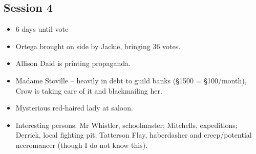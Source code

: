 \documentclass[10pt,a4paper]{article}
\begin{document}
\subsection*{Session 4}
  
  \begin{itemize}
    \item 6 days until vote
    \item Ortega brought on side by Jackie, bringing 36 votes.
    \item Allison Daid is printing propaganda.
    \item Madame Stoville -- heavily in debt to guild banks (§1500 = §100/month), Crow is taking care of it and blackmailing her.
    \item Mysterious red-haired lady at saloon.
    \item Interesting persons: Mr Whistler, schoolmaster; Mitchells, expeditions; Derrick, local fighting pit; Tatterson Flay, haberdasher and creep/potential necromancer (though I do not know this).
  \end{itemize}
\end{document}
